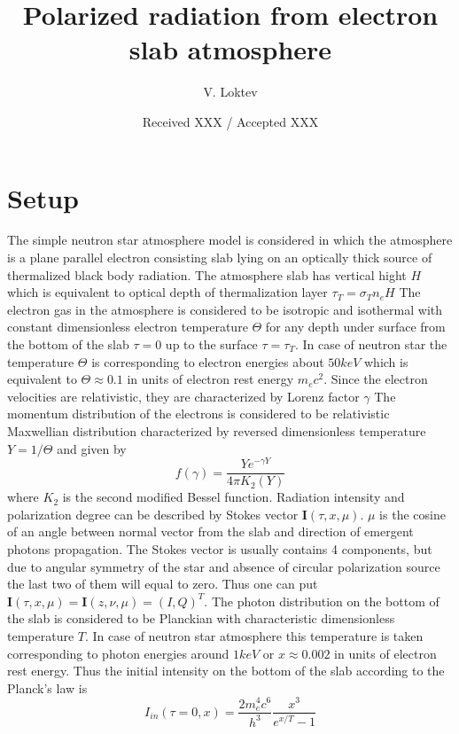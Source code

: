 \documentclass[iop, usenatbib]{emulateapj}
\newcommand{\be}{\begin{equation}}
\newcommand{\ee}{\end{equation}}
\begin{document}
\title{Polarized radiation from electron slab atmosphere}



\author{ V. Loktev }


\date{Received XXX / Accepted XXX}



\begin{abstract}
\lipsum[1]
\end{abstract}




\maketitle

\section{Setup}
The simple neutron star atmosphere model is considered in which the atmosphere is a plane parallel electron consisting slab lying on an optically thick source of thermalized  black body radiation.
The atmosphere slab has vertical hight $H$ which is equivalent to optical depth of thermalization layer $\tau_T=\sigma_Tn_eH$    
The electron gas in the atmosphere is considered to be isotropic and isothermal with constant dimensionless electron temperature $\Theta$ for any depth under surface from the bottom of the slab $\tau=0$ up to the surface $\tau=\tau_T$.
In case of neutron star the temperature $\Theta$ is corresponding to electron energies about $50 keV$ which is equivalent to $\Theta\approx 0.1$ in units of electron rest energy $m_ec^2$. 
Since the electron velocities are relativistic, they are characterized by Lorenz factor $\gamma$
The momentum distribution of the electrons is considered to be relativistic Maxwellian distribution characterized by reversed dimensionless temperature $Y = 1/ \Theta$ and given by 
\be
f(\gamma)= \frac{Y e^{-\gamma Y}}{4\pi K_2(Y)}
\ee
where $K_2$ is the second modified Bessel function.  
Radiation intensity and polarization degree can be described by Stokes vector $\bm{I}(\tau,x,\mu)$. $\mu$ is the cosine of an angle between normal vector from the slab and direction of emergent photons propagation.  
The Stokes vector is usually contains 4 components, but due to angular symmetry of the star and absence of circular polarization source the last two of them will equal to zero.
Thus one can put $\bm{I}(\tau,x,\mu)=\bm{I}(z,\nu,\mu) = (I,Q)^T$.
The photon distribution on the bottom of the slab is considered to be Planckian with characteristic dimensionless temperature $T$.  In case of neutron star atmosphere this temperature is taken corresponding to photon energies around $1keV$ or $x\approx 0.002$ in  units of electron rest energy.
Thus the initial intensity on the bottom of the slab according to the Planck's law is
\be
I_{in}(\tau=0,x)=\frac{2m_e^4c^6}{h^3}\frac{x^3}{e^{x/T}-1}
\ee   
\end{document}
